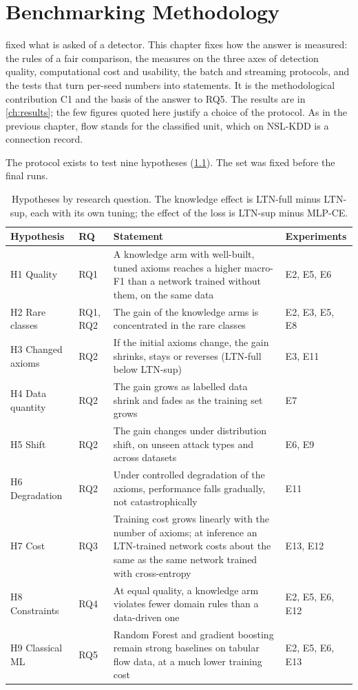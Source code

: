 \chapter{Benchmarking Methodology}
\label{ch:benchmarking-methodology}

 fixed what is asked of a detector. This chapter fixes how the
answer is measured: the rules of a fair comparison, the measures on the three axes of
detection quality, computational cost and usability, the batch and streaming
protocols, and the tests that turn per-seed numbers into statements. It is the
methodological contribution C1 and the basis of the answer to RQ5. The results are in
\cref{ch:results}; the few figures quoted here justify a choice of the protocol. As in the
previous chapter, flow stands for the classified unit, which on NSL-KDD is a connection record.

The protocol exists to test nine hypotheses (\cref{tab:hypotheses}). The set was fixed before the final runs.

\begin{table}[t]
\centering
\footnotesize
\caption{Hypotheses by research question. The knowledge effect is LTN-full minus
LTN-sup, each with its own tuning; the effect of the loss is LTN-sup minus MLP-CE.}
\label{tab:hypotheses}
\setlength{\tabcolsep}{4pt}
\begin{tabular}{@{}p{1.9cm}p{1.4cm}p{7.5cm}p{2.1cm}@{}}
\toprule
Hypothesis & RQ & Statement & Experiments \\
\midrule
H1 Quality & RQ1 & A knowledge arm with well-built, tuned axioms reaches a higher
  macro-F1 than a network trained without them, on the same data & E2, E5, E6 \\
H2 Rare classes & RQ1, RQ2 & The gain of the knowledge arms is concentrated in the
  rare classes & E2, E3, E5, E8 \\
H3 Changed axioms & RQ2 & If the initial axioms change, the gain shrinks, stays or
  reverses (LTN-full below LTN-sup) & E3, E11 \\
H4 Data quantity & RQ2 & The gain grows as labelled data shrink and fades as the
  training set grows & E7 \\
H5 Shift & RQ2 & The gain changes under distribution shift, on unseen attack types and
  across datasets & E6, E9 \\
H6 Degradation & RQ2 & Under controlled degradation of the axioms, performance falls
  gradually, not catastrophically & E11 \\
H7 Cost & RQ3 & Training cost grows linearly with the number of axioms; at inference an
  LTN-trained network costs about the same as the same network trained with
  cross-entropy & E13, E12 \\
H8 Constraints & RQ4 & At equal quality, a knowledge arm violates fewer domain rules
  than a data-driven one & E2, E5, E6, E12 \\
H9 Classical ML & RQ5 & Random Forest and gradient boosting remain strong baselines on
  tabular flow data, at a much lower training cost & E2, E5, E6, E13 \\
\bottomrule
\end{tabular}
\end{table}


